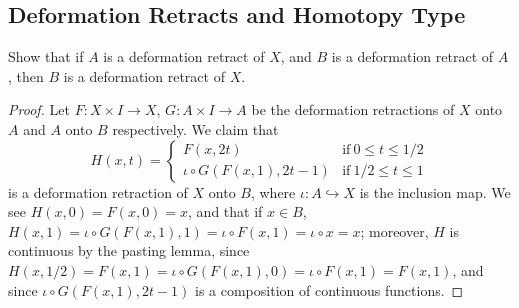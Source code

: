 \documentclass[12pt]{article}
\theoremstyle{remark}
\begin{document}
\subsection{Deformation Retracts and Homotopy Type}
\begin{problem}
  Show that if $A$ is a deformation retract of $X$, and $B$ is a deformation retract of $A$, then $B$ is a deformation retract of $X$.
\end{problem}
\begin{proof}
  Let $F\colon X \times I \to X$, $G\colon A \times I \to A$ be the deformation retractions of $X$ onto $A$ and $A$ onto $B$ respectively. We claim that
  \begin{equation*}
    H(x,t) = \begin{cases}
      F(x,2t) & \text{if}~0 \le t \le 1/2\\
      \iota \circ G(F(x,1),2t-1) & \text{if}~1/2 \le t \le 1
    \end{cases}
  \end{equation*}
  is a deformation retraction of $X$ onto $B$, where $\iota\colon A \hookrightarrow X$ is the inclusion map. We see $H(x,0) = F(x,0) = x$, and that if $x \in B$, $H(x,1) = \iota \circ G(F(x,1),1) = \iota \circ F(x,1) = \iota \circ x = x$; moreover, $H$ is continuous by the pasting lemma, since $H(x,1/2) = F(x,1) = \iota \circ G(F(x,1),0) = \iota \circ F(x,1) = F(x,1)$, and since $\iota \circ G(F(x,1),2t-1)$ is a composition of continuous functions.
\end{proof}
\end{document}
